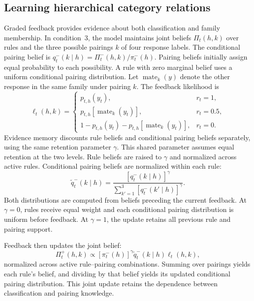\subsection*{Learning hierarchical category relations}
\label{m:pairing}

Graded feedback provides evidence about both classification and family membership. In condition~3, the model maintains joint beliefs $\Pi_t(h,k)$ over rules and the three possible pairings $k$ of four response labels. The conditional pairing belief is $q_t^-(k\mid h)=\Pi_t^-(h,k)/\pi_t^-(h)$. Pairing beliefs initially assign equal probability to each possibility. A rule with zero marginal belief uses a uniform conditional pairing distribution. Let $\operatorname{mate}_k(y)$ denote the other response in the same family under pairing $k$. The feedback likelihood is
\begin{equation}
\ell_t(h,k)=
\begin{cases}
p_{t,h}(y_t),&r_t=1,\\
p_{t,h}[\operatorname{mate}_k(y_t)],&r_t=0.5,\\
1-p_{t,h}(y_t)-p_{t,h}[\operatorname{mate}_k(y_t)],&r_t=0.
\end{cases}
\label{eq:graded-likelihood}
\end{equation}
Evidence memory discounts rule beliefs and conditional pairing beliefs separately, using the same retention parameter $\gamma$. This shared parameter assumes equal retention at the two levels. Rule beliefs are raised to $\gamma$ and normalized across active rules. Conditional pairing beliefs are normalized within each rule:
\begin{equation}
\widetilde q_t^-(k\mid h)=
\frac{[q_t^-(k\mid h)]^{\gamma}}
{\sum_{k'=1}^{3}[q_t^-(k'\mid h)]^{\gamma}}.
\label{eq:discounted-pairing}
\end{equation}
Both distributions are computed from beliefs preceding the current feedback. At $\gamma=0$, rules receive equal weight and each conditional pairing distribution is uniform before feedback. At $\gamma=1$, the update retains all previous rule and pairing support.

Feedback then updates the joint belief:
\begin{equation}
\Pi_t^+(h,k)\propto[\pi_t^-(h)]^{\gamma}\widetilde q_t^-(k\mid h)\ell_t(h,k),
\label{eq:joint-feedback-update}
\end{equation}
normalized across active rule--pairing combinations. Summing over pairings yields each rule's belief, and dividing by that belief yields its updated conditional pairing distribution. This joint update retains the dependence between classification and pairing knowledge.


